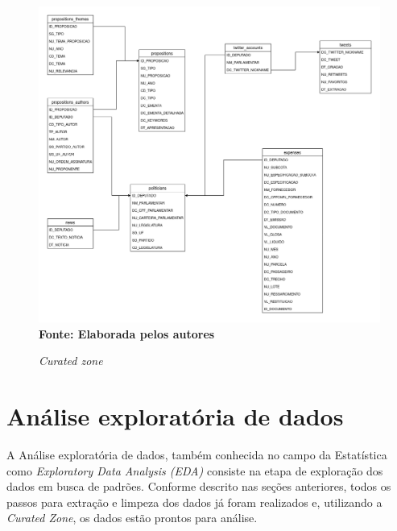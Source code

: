 \begin{figure}[H]
	\centering	
	\caption[\hspace{0.1cm}Zona Curated]{\textit{Curated zone}}
	  \vspace{-0.4cm}
	\includegraphics[width=.8\textwidth]{figuras/er_tcc.png}
	 \vspace{-0.3cm}
	\\\textbf{\footnotesize Fonte: Elaborada pelos autores}
	\label{fig:tela1}
\end{figure}

\section{Análise exploratória de dados} A Análise exploratória de dados, também conhecida no campo da Estatística como \textit{Exploratory Data Analysis (EDA)} consiste na etapa de exploração dos dados em busca de padrões. Conforme descrito nas seções anteriores, todos os passos para extração e limpeza dos dados já foram realizados e, utilizando a \textit{Curated Zone}, os dados estão prontos para análise.